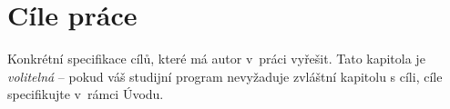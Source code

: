 \chapter*{Cíle práce}
{}

Konkrétní specifikace cílů, které má autor v~práci vyřešit.
Tato kapitola je \emph{volitelná} -- pokud váš studijní program nevyžaduje zvláštní kapitolu s cíli,
cíle specifikujte v~rámci Úvodu.
